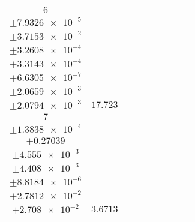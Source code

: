 \documentclass[8pt]{article}
\begin{document}
\begin{longtable}[l]{c c c c c c c c c}
$\num{6}$ & \begin{tabular}[c]{@{}c@{}}$\num{0.12201}$ \\ $\pm\num{7.9326e-5}$\end{tabular} & \begin{tabular}[c]{@{}c@{}}$\num{0.86164}$ \\ $\pm\num{3.7153e-2}$\end{tabular} & \begin{tabular}[c]{@{}c@{}}$\num{7.3975}$ \\ $\pm\num{3.2608e-4}$\end{tabular} & \begin{tabular}[c]{@{}c@{}}$\num{1.3793e+3}$ \\ $\pm\num{3.3143e-4}$\end{tabular} & \begin{tabular}[c]{@{}c@{}}$\num{2.7594}$ \\ $\pm\num{6.6305e-7}$\end{tabular} & \begin{tabular}[c]{@{}c@{}}$\num{2.691}$ \\ $\pm\num{2.0659e-3}$\end{tabular} & \begin{tabular}[c]{@{}c@{}}$\num{2.7078}$ \\ $\pm\num{2.0794e-3}$\end{tabular} & $\num{17.723}$\\
$\num{7}$ & \begin{tabular}[c]{@{}c@{}}$\num{2.9988e-2}$ \\ $\pm\num{1.3838e-4}$\end{tabular} & \begin{tabular}[c]{@{}c@{}}$\num{0.41945}$ \\ $\pm\num{0.27039}$\end{tabular} & \begin{tabular}[c]{@{}c@{}}$\num{-15.869}$ \\ $\pm\num{4.555e-3}$\end{tabular} & \begin{tabular}[c]{@{}c@{}}$\num{1.4225e+3}$ \\ $\pm\num{4.408e-3}$\end{tabular} & \begin{tabular}[c]{@{}c@{}}$\num{2.8457}$ \\ $\pm\num{8.8184e-6}$\end{tabular} & \begin{tabular}[c]{@{}c@{}}$\num{5.0452}$ \\ $\pm\num{2.7812e-2}$\end{tabular} & \begin{tabular}[c]{@{}c@{}}$\num{4.9046}$ \\ $\pm\num{2.708e-2}$\end{tabular} & $\num{3.6713}$\\

\end{longtable}
\end{document}
